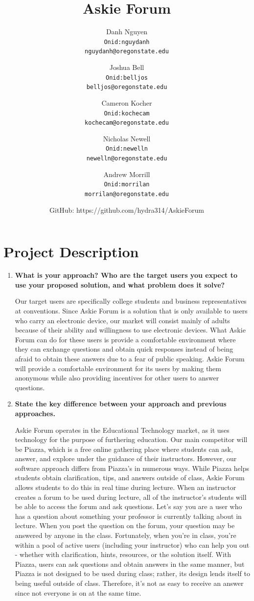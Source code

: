 \documentclass[12pt]{article}
\title{Askie Forum}
\author{
         Danh Nguyen\\
         \texttt{Onid:nguydanh}\\
         \texttt{nguydanh@oregonstate.edu}
         \and
         Joshua Bell\\
         \texttt{Onid:belljos}\\
         \texttt{belljos@oregonstate.edu}
         \and
         Cameron Kocher\\
         \texttt{Onid:kochecam}\\
         \texttt{kochecam@oregonstate.edu}
         \and
         Nicholas Newell\\
         \texttt{Onid:newelln}\\
         \texttt{newelln@oregonstate.edu}
         \and
         Andrew Morrill\\
         \texttt{Onid:morrilan}\\
         \texttt{morrilan@oregonstate.edu}
         \and
         GitHub: https://github.com/hydra314/AskieForum
    }
\begin{document}
\maketitle

\tableofcontents
\section{Project Description}
\begin{enumerate}
    \item \textbf{What is your approach? Who are the target users you expect to use your proposed solution, and what problem does it solve?}

        Our target users are specifically college students and business representatives at conventions. Since Askie Forum is a solution that is only available to users who carry an electronic device, our market will consist mainly of adults because of their ability and willingness to use electronic devices. What Askie Forum can do for these users is provide a comfortable environment where they can exchange questions and obtain quick responses instead of being afraid to obtain these answers due to a fear of public speaking. Askie Forum will provide a comfortable environment for its users by making them anonymous while also providing incentives for other users to answer questions.
    
        
    \item \textbf{State the key difference between your approach and previous approaches.}

    Askie Forum operates in the Educational Technology market, as it uses technology for the purpose of furthering education. Our main competitor will be Piazza, which is a free online gathering place where students can ask, answer, and explore under the guidance of their instructors. However, our software approach differs from Piazza's in numerous ways. While Piazza helps students obtain clarification, tips, and answers outside of class, Askie Forum allows students to do this in real time during lecture. When an instructor creates a forum to be used during lecture, all of the instructor's students will be able to access the forum and ask questions. Let’s say you are a user who has a question about something your professor is currently talking about in lecture. When you post the question on the forum, your question may be answered by anyone in the class. Fortunately,  when you're in class, you're within a pool of active users (including your instructor) who can help you out - whether with clarification, hints, resources, or the solution itself. With Piazza, users can ask questions and obtain answers in the same manner, but Piazza is not designed to be used during class; rather, its design lends itself to being useful outside of class. Therefore, it's not as easy to receive an answer since not everyone is on at the same time. 
    

\end{enumerate}
\end{document}
